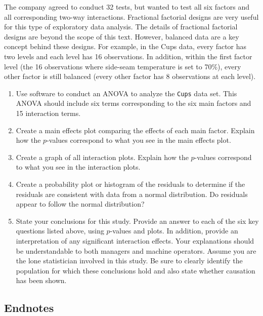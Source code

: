 \documentclass[
]{book}
\begin{document}
\begin{enumerate}
The company agreed to conduct 32 tests, but wanted to test all six factors and all corresponding two-way interactions. Fractional factorial designs are very useful for this type of exploratory data analysis. The details of fractional factorial designs are beyond the scope of this text. However, balanced data are a key concept behind these designs. For example, in the Cups data, every factor has two levels and each level has 16 observations. In addition, within the first factor level (the 16 observations where side-seam temperature is set to 70\%), every other factor is still balanced (every other factor has 8 observations at each level).

  \begin{enumerate}
    \item Use software to conduct an ANOVA to analyze the \texttt{Cups} data set. This ANOVA should include six terms corresponding to the six main factors and 15 interaction terms.
    \item Create a main effects plot comparing the effects of each main factor. Explain how the $p$-values correspond to what you see in the main effects plot.
    \item Create a graph of all interaction plots. Explain how the $p$-values correspond to what you see in the interaction plots.
    \item Create a probability plot or histogram of the residuals to determine if the residuals are consistent with data from a normal distribution. Do residuals appear to follow the normal distribution?
    \item State your conclusions for this study. Provide an answer to each of the six key questions listed above, using $p$-values and plots. In addition, provide an interpretation of any significant interaction effects. Your explanations should be understandable to both managers and machine operators. Assume you are the lone statistician involved in this study. Be sure to clearly identify the population for which these conclusions hold and also state whether causation has been shown.
  \end{enumerate}

\end{enumerate}

\hypertarget{endnotes-2}{%
\subsection*{Endnotes}\label{endnotes-2}}
\end{document}
